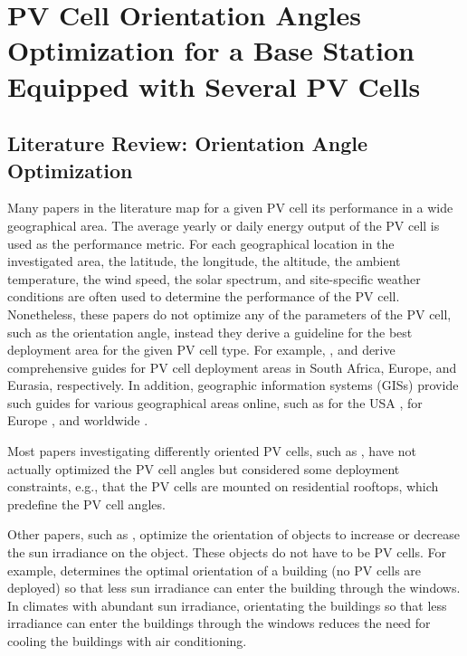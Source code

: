 \clearpage
\chapter{PV Cell Orientation Angles Optimization for a Base Station Equipped with Several PV Cells\label{Chapter_1}}

\section{Literature Review: Orientation Angle Optimization}
Many papers in the literature map for a given PV cell its performance in a wide geographical area. The average yearly or daily energy output of the PV cell is used as the performance metric. For each geographical location in the investigated area, the latitude, the longitude, the altitude, the ambient temperature, the wind speed, the solar spectrum, and site-specific weather conditions are often used to determine the performance of the PV cell. Nonetheless, these papers do not optimize any of the parameters of the PV cell, such as the orientation angle, instead they derive a guideline for the best deployment area for the given PV cell type. For example, \cite{south_africa}, \cite{HuldThomas2010Mtpo} and \cite{ThomasHuld2015EPMP} derive comprehensive guides for PV cell deployment areas in South Africa, Europe, and Eurasia, respectively.  
In addition, geographic information systems (GISs) provide such guides for various geographical areas online, such as for the USA \cite{usa}, for Europe \cite{PVGIS}, and worldwide \cite{worldwide,worldwide2}. 



Most papers investigating differently oriented PV cells, such as \cite{ORDONEZ20102122}, have not actually optimized the PV cell angles but considered some deployment constraints, e.g., that the PV cells are mounted on residential rooftops, which predefine the PV cell angles. 

Other papers, such as \cite{VALLADARESRENDON2017458}, optimize the orientation of objects to increase or decrease the sun irradiance on the object. These objects do not have to be PV cells. For example, \cite{VALLADARESRENDON2017458} determines the optimal orientation of a building (no PV cells are deployed) so that less sun irradiance can enter the building through the windows. In climates with abundant sun irradiance, orientating the buildings so that less irradiance can enter the buildings through the windows reduces the need for cooling the buildings with air conditioning.


